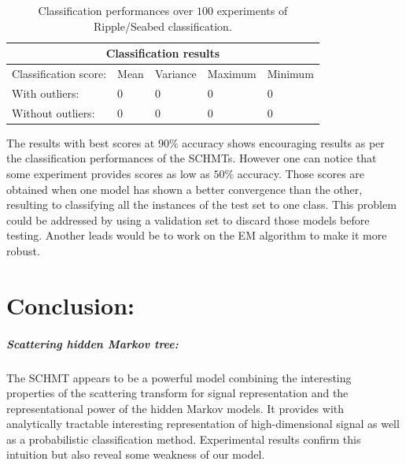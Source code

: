 \documentclass[a4paper,11pt]{report}
\begin{document}
		\begin{center}
			\begin{table}
				\begin{center}				
					\begin{tabular}{ |p{3cm}||p{2cm}|p{2cm}|p{2cm}|p{2cm}|  }
						\hline
						\multicolumn{5}{|c|}{Classification results} \\
						\hline
						Classification score:		& Mean	& Variance	& Maximum	& Minimum \\
						\hline
						With outliers:					& 0	    & 0					& 0				& 0\\
						Without outliers:				& 0	    & 0					& 0				& 0\\
						\hline
					\end{tabular}
				\end{center}
				\label{tab:Clf_ripple}
				\caption{Classification performances over $100$ experiments of Ripple/Seabed classification.}
			\end{table}
		\end{center}
		
		The results with best scores at $90\%$ accuracy shows encouraging results as per the classification performances of the SCHMTs. However one can notice that some experiment provides scores as low as $50\%$ accuracy. Those scores are obtained when one model has shown a better convergence than the other, resulting to classifying all the instances of the test set to one class. This problem could be addressed by using a validation set to discard those models before testing. Another leads would be to work on the EM algorithm to make it more robust.
		
		
\chapter{Conclusion:}

  \paragraph{Scattering hidden Markov tree:}
    The SCHMT appears to be a powerful model combining the interesting properties of the scattering transform for signal representation and the representational power of the hidden Markov models. It provides with analytically tractable interesting representation of high-dimensional signal as well as a probabilistic classification method. Experimental results confirm this intuition but also reveal some weakness of our model.\\
    
\end{document}
